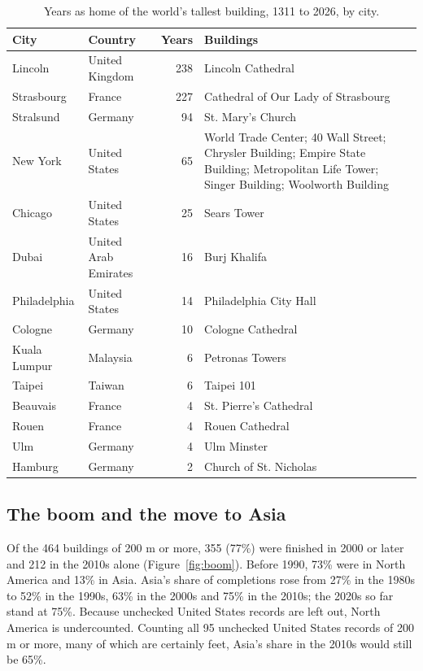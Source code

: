 \documentclass[11pt,a4paper]{article}
\begin{document}
\begin{table}[tbp]\centering\small\caption{Years as home of the world's tallest building, 1311 to 2026, by city.}\label{tab:cities}\begin{tabular}{llr>{\raggedright\arraybackslash}p{6.4cm}}\toprule City & Country & Years & Buildings\\\midrule
Lincoln & United Kingdom & 238 & Lincoln Cathedral\\
Strasbourg & France & 227 & Cathedral of Our Lady of Strasbourg\\
Stralsund & Germany & 94 & St. Mary's Church\\
New York & United States & 65 & 1 World Trade Center; 40 Wall Street; Chrysler Building; Empire State Building; Metropolitan Life Tower; Singer Building; Woolworth Building\\
Chicago & United States & 25 & Sears Tower\\
Dubai & United Arab Emirates & 16 & Burj Khalifa\\
Philadelphia & United States & 14 & Philadelphia City Hall\\
Cologne & Germany & 10 & Cologne Cathedral\\
Kuala Lumpur & Malaysia & 6 & Petronas Towers\\
Taipei & Taiwan & 6 & Taipei 101\\
Beauvais & France & 4 & St. Pierre's Cathedral\\
Rouen & France & 4 & Rouen Cathedral\\
Ulm & Germany & 4 & Ulm Minster\\
Hamburg & Germany & 2 & Church of St. Nicholas\\
\bottomrule\end{tabular}\end{table}

\subsection{The boom and the move to Asia}
Of the 464 buildings of 200 m or more, 355 (77\%) were finished in 2000 or later and 212 in the 2010s alone (Figure~\ref{fig:boom}). Before 1990, 73\% were in North America and 13\% in Asia. Asia's share of completions rose from 27\% in the 1980s to 52\% in the 1990s, 63\% in the 2000s and 75\% in the 2010s; the 2020s so far stand at 75\%. Because unchecked United States records are left out, North America is undercounted. Counting all 95 unchecked United States records of 200 m or more, many of which are certainly feet, Asia's share in the 2010s would still be 65\%.
\end{document}

